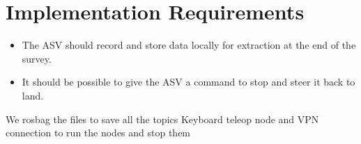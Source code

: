 \section{Implementation Requirements}
\begin{itemize}
    \item The ASV should record and store data locally for extraction at the end of the survey.
    \item It should be possible to give the ASV a command to stop and steer it back to land.
\end{itemize}

We rosbag the files to save all the topics
Keyboard teleop node and VPN connection to run the nodes and stop them